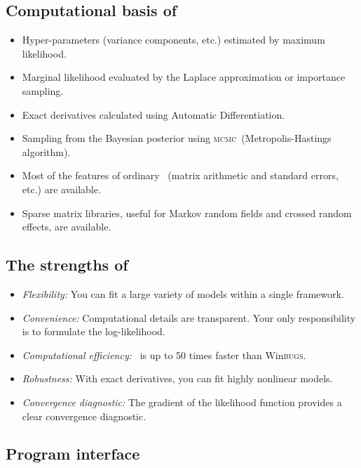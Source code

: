 \documentclass{admbmanual}
\newcommand{\scMCMC}{\textsc{mcmc}}
\newcommand{\scWinBUGS}{Win\textsc{bugs}}
\begin{document}
\subsection{Computational basis of \scAR}

\begin{itemize}
  \item Hyper-parameters (variance components, etc.) estimated by maximum
  likelihood.

  \item Marginal likelihood evaluated by the Laplace approximation or importance
  sampling.

  \item Exact derivatives calculated using Automatic Differentiation.

  \item Sampling from the Bayesian posterior using \scMCMC\ (Metropolis-Hastings
  algorithm).

  \item Most of the features of ordinary \scAB\ (matrix arithmetic and standard
  errors, etc.) are available.

  \item Sparse matrix libraries, useful for Markov random fields and crossed
  random effects, are available.
\end{itemize}

\subsection{The strengths of \scAR}

\begin{itemize}
  \item \textit{Flexibility:} You can fit a large variety of models within a
  single framework.
  \item \textit{Convenience:} Computational details are transparent. Your only
  responsibility is to formulate the log-likelihood.
  \item \textit{Computational efficiency:} \scAR\ is up to 50 times faster than
  \scWinBUGS.
  \item \textit{Robustness:} With exact derivatives, you can fit highly
  nonlinear models.
  \item \textit{Convergence diagnostic:} The gradient of the likelihood function
  provides a clear convergence diagnostic.
\end{itemize}

\subsection{Program interface}
\end{document}

